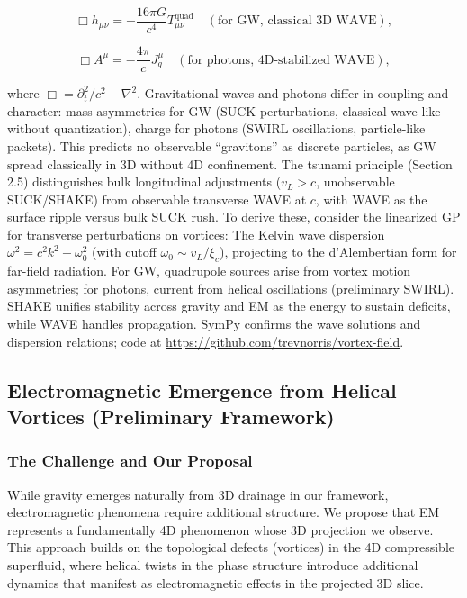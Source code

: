 \begin{equation}
\Box h_{\mu\nu} = -\frac{16\pi G}{c^4} T_{\mu\nu}^{\text{quad}} \quad (\text{for GW, classical 3D WAVE}),
\end{equation}

\begin{equation}
\Box A^\mu = -\frac{4\pi}{c} J_q^\mu \quad (\text{for photons, 4D-stabilized WAVE}),
\end{equation}

where $\Box = \partial_t^2 / c^2 - \nabla^2$. Gravitational waves and photons differ in coupling and character: mass asymmetries for GW (SUCK perturbations, classical wave-like without quantization), charge for photons (SWIRL oscillations, particle-like packets). This predicts no observable ``gravitons'' as discrete particles, as GW spread classically in 3D without 4D confinement. The tsunami principle (Section 2.5) distinguishes bulk longitudinal adjustments ($v_L > c$, unobservable SUCK/SHAKE) from observable transverse WAVE at $c$, with WAVE as the surface ripple versus bulk SUCK rush. To derive these, consider the linearized GP for transverse perturbations on vortices: The Kelvin wave dispersion $\omega^2 = c^2 k^2 + \omega_0^2$ (with cutoff $\omega_0 \sim v_L / \xi_c$), projecting to the d'Alembertian form for far-field radiation. For GW, quadrupole sources arise from vortex motion asymmetries; for photons, current from helical oscillations (preliminary SWIRL). SHAKE unifies stability across gravity and EM as the energy to sustain deficits, while WAVE handles propagation. SymPy confirms the wave solutions and dispersion relations; code at \url{https://github.com/trevnorris/vortex-field}.

\subsection{Electromagnetic Emergence from Helical Vortices (Preliminary Framework)}

\subsubsection{The Challenge and Our Proposal}
While gravity emerges naturally from 3D drainage in our framework, electromagnetic phenomena require additional structure. We propose that EM represents a fundamentally 4D phenomenon whose 3D projection we observe. This approach builds on the topological defects (vortices) in the 4D compressible superfluid, where helical twists in the phase structure introduce additional dynamics that manifest as electromagnetic effects in the projected 3D slice.

